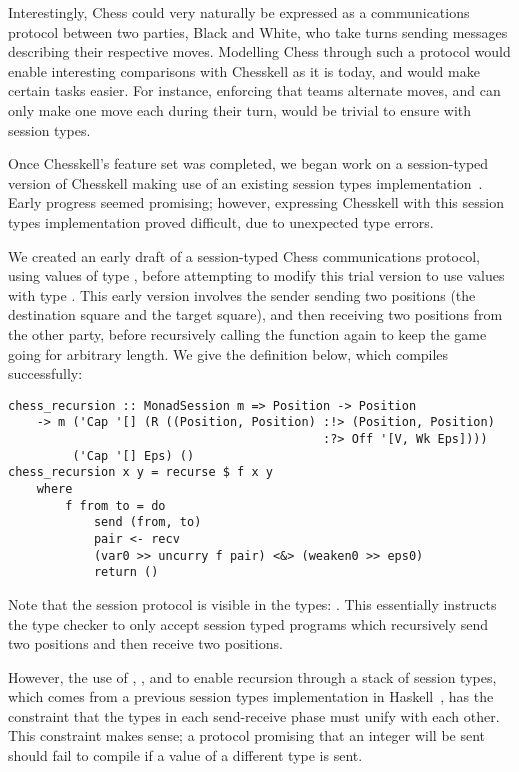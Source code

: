 Interestingly, Chess could very naturally be expressed as a communications protocol between two parties, Black and White, who take turns sending messages describing their respective moves. Modelling Chess through such a protocol would enable interesting comparisons with Chesskell as it is today, and would make certain tasks easier. For instance, enforcing that teams alternate moves, and can only make one move each during their turn, would be trivial to ensure with session types.

Once Chesskell's feature set was completed, we began work on a session-typed version of Chesskell making use of an existing session types implementation~\cite{sesstypesincloudhaskell}. Early progress seemed promising; however, expressing Chesskell with this session types implementation proved difficult, due to unexpected type errors.

We created an early draft of a session-typed Chess communications protocol, using values of type , before attempting to modify this trial version to use  values with type . This early version involves the sender sending two positions (the destination square and the target square), and then receiving two positions from the other party, before recursively calling the function again to keep the game going for arbitrary length. We give the definition below, which compiles successfully:

\begin{lstlisting}
chess_recursion :: MonadSession m => Position -> Position
    -> m ('Cap '[] (R ((Position, Position) :!> (Position, Position)
                                            :?> Off '[V, Wk Eps])))
         ('Cap '[] Eps) ()
chess_recursion x y = recurse $ f x y
    where
        f from to = do
            send (from, to)
            pair <- recv
            (var0 >> uncurry f pair) <&> (weaken0 >> eps0)
            return ()
\end{lstlisting}

Note that the session protocol is visible in the types: . This essentially instructs the type checker to only accept session typed programs which recursively send two positions and then receive two positions.

However, the use of , , and  to enable recursion through a stack of session types, which comes from a previous session types implementation in Haskell~\cite{sessalmostnoclass}, has the constraint that the types in each send-receive phase must unify with each other. This constraint makes sense; a protocol promising that an integer will be sent should fail to compile if a value of a different type is sent.

